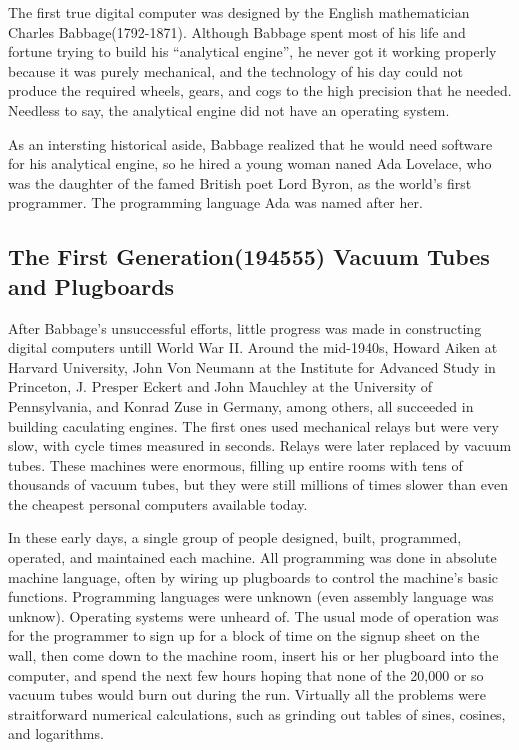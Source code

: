 \documentclass{book}
\begin{document}
The first true digital computer was designed by the English mathematician Charles Babbage(1792-1871).
Although Babbage spent most of his life and fortune trying to build his ``analytical engine'', 
he never got it working properly because it was purely mechanical, 
and the technology of his day could not produce the required wheels, gears, and cogs to the high precision that he needed.
Needless to say, the analytical engine did not have an operating system.

As an intersting historical aside, Babbage realized that he would need software for his analytical engine, 
so he hired a young woman naned Ada Lovelace, who was the daughter of the famed British poet Lord Byron, as the world's first programmer.
The programming language Ada was named after her.

\subsection{The First Generation(194555) Vacuum Tubes and Plugboards}
After Babbage's unsuccessful efforts, little progress was made in constructing digital computers untill World War II.
Around the mid-1940s, Howard Aiken at Harvard University, John Von Neumann at the Institute for Advanced Study in Princeton, 
J. Presper Eckert and John Mauchley at the University of Pennsylvania, and Konrad Zuse in Germany, 
among others, all succeeded in building caculating engines.
The first ones used mechanical relays but were very slow, with cycle times measured in seconds.
Relays were later replaced by vacuum tubes.
These machines were enormous, filling up entire rooms with tens of thousands of vacuum tubes, 
but they were still millions of times slower than even the cheapest personal computers available today.

In these early days, a single group of people designed, built, programmed, operated, and maintained each machine.
All programming was done in absolute machine language, often by wiring up plugboards to control the machine's basic functions.
Programming languages were unknown (even assembly language was unknow).
Operating systems were unheard of.
The usual mode of operation was for the programmer to sign up for a block of time on the signup sheet on the wall, 
then come down to the machine room, insert his or her plugboard into the computer, 
and spend the next few hours hoping that none of the 20,000 or so vacuum tubes would burn out during the run.
Virtually all the problems were straitforward numerical calculations, such as grinding out tables of sines, cosines, and logarithms.
\end{document}

